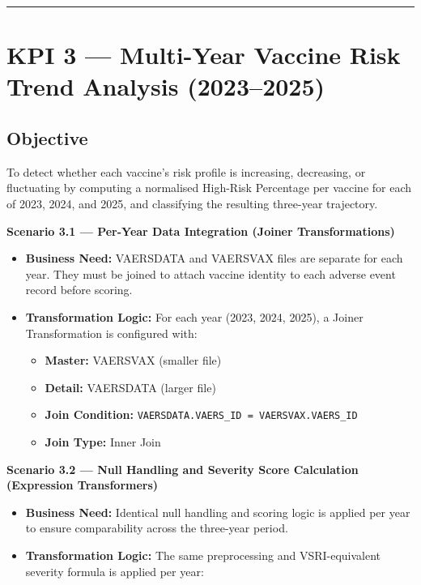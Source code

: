 \documentclass[12pt,a4paper]{report}
\begin{document}
\vspace{10pt}
\noindent\rule{\textwidth}{0.4pt}

\section*{KPI 3 — Multi-Year Vaccine Risk Trend Analysis (2023--2025)}

\subsection*{Objective}
To detect whether each vaccine's risk profile is increasing, decreasing, or fluctuating by computing a normalised High-Risk Percentage per vaccine for each of 2023, 2024, and 2025, and classifying the resulting three-year trajectory.

\bigskip

\noindent\textbf{Scenario 3.1 — Per-Year Data Integration (Joiner Transformations)}

\begin{itemize}[leftmargin=*]
  \item \textbf{Business Need:} VAERSDATA and VAERSVAX files are separate for each year. They must be joined to attach vaccine identity to each adverse event record before scoring.
  \item \textbf{Transformation Logic:} For each year (2023, 2024, 2025), a Joiner Transformation is configured with:
    \begin{itemize}
      \item \textbf{Master:} VAERSVAX (smaller file)
      \item \textbf{Detail:} VAERSDATA (larger file)
      \item \textbf{Join Condition:} \texttt{VAERSDATA.VAERS\_ID = VAERSVAX.VAERS\_ID}
      \item \textbf{Join Type:} Inner Join
    \end{itemize}
\end{itemize}

\bigskip

\noindent\textbf{Scenario 3.2 — Null Handling and Severity Score Calculation (Expression Transformers)}

\begin{itemize}[leftmargin=*]
  \item \textbf{Business Need:} Identical null handling and scoring logic is applied per year to ensure comparability across the three-year period.
  \item \textbf{Transformation Logic:} The same preprocessing and VSRI-equivalent severity formula is applied per year:
\end{itemize}
\end{document}
